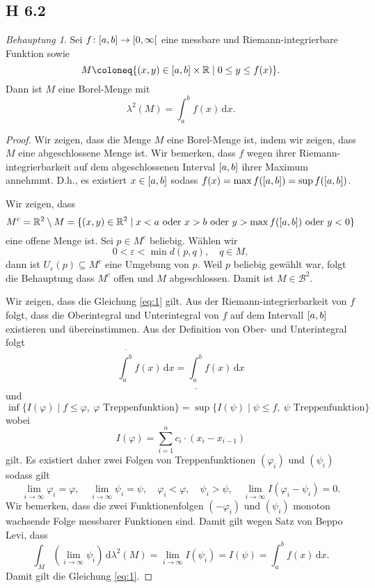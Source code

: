 \documentclass[draft,a5paper]{article}
\theoremstyle{remark}
\newtheorem*{Behauptung}{Behauptung}
\newcommand{\dd}{\,\mathrm{d}}
\begin{document}
\subsection{H 6.2}
\begin{Behauptung}
  Sei \(f\colon \interval{a}{b} \to \rinterval{0}{\infty}\) eine messbare und
  Riemann-integrierbare Funktion sowie
  \[M \coloneq \{(x, y) \in \interval{a}{b} \times \mathbb{R} \mid 0 \le y \le f(x)\}.\]
  Dann ist \(M\) eine Borel-Menge mit
  \begin{equation}
    \label{eq:1}
    \lambda^{2}(M) = \int_{a}^{b}{f(x) \dd x}.
  \end{equation}
\end{Behauptung}
\begin{proof}
  Wir zeigen, dass die Menge \(M\) eine Borel-Menge ist, indem wir
  zeigen, dass \(M\) eine abgeschlossene Menge ist.  Wir bemerken, dass
  \(f\) wegen ihrer Riemann-integrierbarkeit auf dem abgeschlossenen
  Interval \(\interval{a}{b}\) ihrer Maximum annehmmt.  D.h., es
  existiert \(x \in \interval{a}{b}\) sodass \(f(x) = \max
  f(\interval{a}{b}) = \sup f(\interval{a}{b})\).

  Wir zeigen, dass
  \[M^{c} = \mathbb{R}^{2} \setminus M = \{(x,y) \in \mathbb{R}^{2} \mid x < a \text{ oder } x > b
    \text{ oder } y > \max f(\interval{a}{b}) \text{ oder } y < 0\}\]
  eine offene Menge ist.  Sei \(p \in M^{c}\) beliebig.  Wählen wir
  \[0 < \varepsilon < \min d(p, q), \quad q \in M,\] dann ist
  \(U_{\varepsilon}(p) \subseteq M^{c}\) eine Umgebung von \(p\).  Weil \(p\) beliebig gewählt
  war, folgt die Behauptung dass \(M^{c}\) offen und \(M\) abgeschlossen.
  Damit ist \(M \in \mathcal{B}^{2}\).

  Wir zeigen, dass die Gleichung \eqref{eq:1} gilt.  Aus der
  Riemann-integrierbarkeit von \(f\) folgt, dass die Oberintegral und
  Unterintegral von \(f\) auf dem Intervall \(\interval{a}{b}\)
  existieren und übereinstimmen.  Aus der Definition von Ober- und
  Unterintegral folgt
\[    \overline{\int_{a}^{b}}{f(x)\dd x}
    = \underline{\int_{a}^{b}}{f(x) \dd x}\]
  und
  \[    \inf\{I(\varphi) \mid f \le \varphi,~ \varphi \text{ Treppenfunktion}\}
    = \sup\{I(\psi) \mid \psi \le f,~ \psi \text{ Treppenfunktion}\}\]
  wobei
  \[I(\varphi) = \sum_{i=1}^{n}{c_{i} \cdot (x_{i} - x_{i-1})}\]
  gilt.  Es existiert daher zwei Folgen von Treppenfunktionen
  \((\varphi_{i})\) und \((\psi_{i})\) sodass gilt
  \[\lim_{i \to \infty} \varphi_{i} = \varphi, \quad \lim_{i \to \infty} \psi_{i} = \psi, \quad \varphi_{i} < \varphi, \quad
    \psi_{i} > \psi, \quad \lim_{i \to \infty}{I(\varphi_{i} - \psi_{i})} = 0.\]
  Wir bemerken, dass die zwei Funktionenfolgen \((-\varphi_{i})\) und \((\psi_{i})\)
  monoton wachsende Folge messbarer Funktionen sind.  Damit gilt wegen
  Satz von Beppo Levi, dass
  \[\int_{M}(\lim_{i \to \infty}\psi_{i}) \dd \lambda^{2}(M) = \lim_{i \to \infty}I(\psi_{i}) =
    I(\psi) = \int_{a}^{b}{f(x) \dd x}. \]
  Damit gilt die Gleichung \eqref{eq:1}.
\end{proof}
\end{document}

